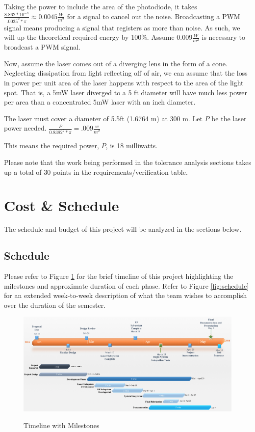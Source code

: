 \documentclass[openbib,letterpaper,10pt]{article}
\begin{document}
\begin{spacing}{1.15}
Taking the power to include the area of the photodiode, it takes $\frac{8.862*10^{-8}}{.0025^2 * \pi} \approx 0.0045 \frac{W}{m^2}$ for a signal to cancel out the noise. Broadcasting a PWM signal means producing a signal that registers as more than noise. As such, we will up the theoretical required energy by $100\%$. Assume $0.009 \frac{W}{m^2}$ is necessary to broadcast a PWM signal. 

Now, assume the laser comes out of a diverging lens in the form of a cone. Neglecting dissipation from light reflecting off of air, we can assume that the loss in power per unit area of the laser happens with respect to the area of the light spot. That is, a 5mW laser diverged to a 5 ft diameter will have much less power per area than a concentrated 5mW laser with an inch diameter.

The laser must cover a diameter of 5.5ft (1.6764 m) at 300 m. Let $P$ be the laser power needed. $\frac{P}{0.8382^2* \pi} = .009  \frac{w}{m^2}$

This means the required power, $P$, is 18 milliwatts. 

Please note that the work being performed in the tolerance analysis sections takes up a total of 30 points in the requirements/verification table. 


\section{Cost \& Schedule}
The schedule and budget of this project will be analyzed in the sections below.

\subsection{Schedule}
Please refer to Figure \ref{fig:timeline} for the brief timeline of this project highlighting the milestones and approximate duration of each phase. Refer to Figure \ref{fig:schedule} for an extended week-to-week description of what the team wishes to accomplish over the duration of the semester.


\begin{figure} [H]
	\centering
	\includegraphics[scale=0.45]{Timeline.png}
	\label{fig:timeline}
	\caption{Timeline with Milestones\label{fig:timeline}}
\end{figure}


\end{spacing}
\end{document}
